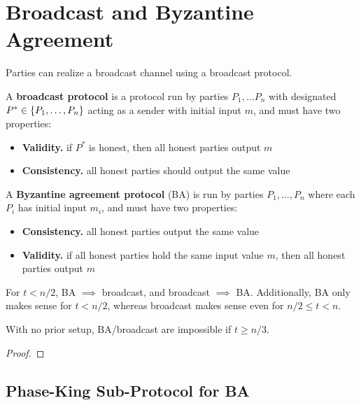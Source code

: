 \section{Broadcast and Byzantine Agreement}

Parties can realize a broadcast channel using a broadcast protocol.

\begin{defn}
A \textbf{broadcast protocol} is a protocol run by parties $P_1, \dots  P_n$ with designated $P^* \in \left\{P_1, \dots, P_n\right\}$ acting as a sender with initial input $m$, and must have two properties:
\begin{itemize}
\item \textbf{Validity.} if $P^*$ is honest, then all honest parties output $m$
\item \textbf{Consistency.} all honest parties should output the same value
\end{itemize}
\end{defn}

\begin{defn}
A \textbf{Byzantine agreement protocol} (BA) is run by parties $P_1, \dots, P_n$ where each $P_i$ has initial input $m_i$, and must have two properties:
\begin{itemize}
\item \textbf{Consistency.} all honest parties output the same value 
\item \textbf{Validity.} if all honest parties hold the same input value $m$, then all honest parties output $m$
\end{itemize}
\end{defn}

For $t < n/2$, BA $\implies$ broadcast, and broadcast $\implies$ BA.
Additionally, BA only makes sense for $t < n/2$, whereas broadcast makes sense even for $n/2 \leq t < n$.

\begin{lem}
With no prior setup, BA/broadcast are impossible if $t \geq n/3$.
\end{lem}
\begin{proof}
\end{proof}

\subsection{Phase-King Sub-Protocol for BA}

